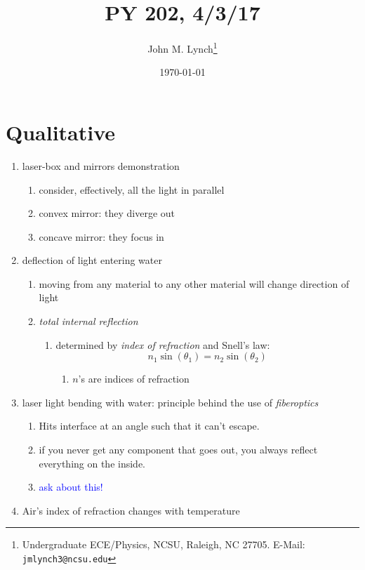 \documentclass[twocolumn,draft]{article}
\title{PY 202, 4/3/17}
\author{John M. Lynch\footnote{Undergraduate ECE/Physics, NCSU, Raleigh, NC 27705. E-Mail: \texttt{jmlynch3@ncsu.edu}}}
\date{\today}
\newcommand{\bt}[1]{\textcolor{blue}{#1}}
\begin{document}
  \maketitle
  \section{Qualitative}
  \begin{enumerate}
  	\item laser-box and mirrors demonstration
		\begin{enumerate}
			\item consider, effectively, all the light
		in parallel
			\item convex mirror: they diverge out
			\item concave mirror: they focus in
		\end{enumerate}
	\item deflection of light entering water
		\begin{enumerate}
		\item moving from any material to any other
		material will change direction of light
		\item \emph{total internal reflection}
			\begin{enumerate}
			\item determined by \emph{index of refraction} and Snell's law:
			\begin{equation}
				n_{1}\sin{(\theta_{1})} = n_{2}\sin{(\theta_{2})}
			\end{equation}
			\begin{enumerate}
				\item $n$'s are indices of refraction
			\end{enumerate}
		\end{enumerate}
		\end{enumerate}
	\item laser light bending with water: principle
	behind the use of \emph{fiberoptics}
		\begin{enumerate}
		\item Hits interface at an angle such that it can't escape.
		\item if you never get any component that goes out, you always reflect everything on the inside.
		\item \bt{ask about this!}
	\end{enumerate}
	\item Air's index of refraction changes with
	temperature
		\begin{enumerate}

\end{enumerate}
\end{enumerate}
\end{document}
